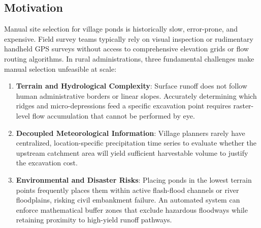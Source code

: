 \documentclass[manuscript,screen,nonacm]{acmart}
\begin{document}
\subsection{Motivation}
Manual site selection for village ponds is historically slow, error-prone, and expensive. Field survey teams typically rely on visual inspection or rudimentary handheld GPS surveys without access to comprehensive elevation grids or flow routing algorithms. In rural administrations, three fundamental challenges make manual selection unfeasible at scale:
\begin{enumerate}
    \item \textbf{Terrain and Hydrological Complexity}: Surface runoff does not follow human administrative borders or linear slopes. Accurately determining which ridges and micro-depressions feed a specific excavation point requires raster-level flow accumulation that cannot be performed by eye.
    \item \textbf{Decoupled Meteorological Information}: Village planners rarely have centralized, location-specific precipitation time series to evaluate whether the upstream catchment area will yield sufficient harvestable volume to justify the excavation cost.
    \item \textbf{Environmental and Disaster Risks}: Placing ponds in the lowest terrain points frequently places them within active flash-flood channels or river floodplains, risking civil embankment failure. An automated system can enforce mathematical buffer zones that exclude hazardous floodways while retaining proximity to high-yield runoff pathways.
\end{enumerate}
\end{document}
